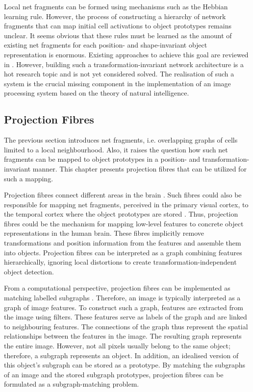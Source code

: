 Local net fragments can be formed using mechanisms such as the Hebbian learning rule. However, the process of constructing a hierarchy of network fragments that can map initial cell activations to object prototypes remains unclear. It seems obvious that these rules must be learned as the amount of existing net fragments for each position- and shape-invariant object representation is enormous. Existing approaches to achieve this goal are reviewed in .
However, building such a transformation-invariant network architecture is a hot research topic \cite{poulenard_effective_2019, mumuni_cnn_2021} and is not yet considered solved. The realisation of such a system is the crucial missing component in the implementation of an image processing system based on the theory of natural intelligence.


\subsection{Projection Fibres}
The previous section introduces net fragments, i.e. overlapping graphs of cells limited to a local neighbourhood. Also, it raises the question how such net fragments can be mapped to object prototypes in a position- and transformation-invariant manner.
This chapter presents projection fibres that can be utilized for such a mapping.

Projection fibres connect different areas in the brain \cite{poljak_experimental_1927, yasui_subparafascicular_1990, yamada_somatotopic_2007}.
Such fibres could also be responsible for mapping net fragments, perceived in the primary visual cortex, to the temporal cortex where the object prototypes are stored \cite{tanigawa_organization_2005, yamada_somatotopic_2007}.
Thus, projection fibres could be the mechanism for mapping low-level features to concrete object representations in the human brain. These fibres implicitly remove transformations and position information from the features and assemble them into objects. Projection fibres can be interpreted as a graph combining features hierarchically, ignoring local distortions to create transformation-independent object detection.

From a computational perspective, projection fibres can be implemented as matching labelled subgraphs \cite{bienenstock_neural_1987, lades_distortion_1993, wiskott_face_1996}.
Therefore, an image is typically interpreted as a graph of image features. To construct such a graph, features are extracted from the image using filters. These features serve as labels of the graph and are linked to neighbouring features. The connections of the graph thus represent the spatial relationships between the features in the image.
The resulting graph represents the entire image. However, not all pixels usually belong to the same object; therefore, a subgraph represents an object.
In addition, an idealised version of this object's subgraph can be stored as a prototype.
By matching the subgraphs of an image and the stored subgraph prototypes, projection fibres can be formulated as a subgraph-matching problem.

